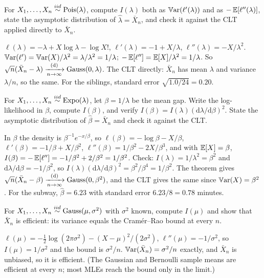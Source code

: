 \begin{exercise}
\label{ex:mle-poisson-info}
For $X_1, \ldots, X_n \stackrel{iid}{\sim} \text{Pois}(\lambda)$, compute $I(\lambda)$ both as $\operatorname*{\mathbb{V}\text{ar}}(\ell'(\lambda))$ and as $-\operatorname*{\mathbb{E}}[\ell''(\lambda)]$, state the asymptotic distribution of $\hat{\lambda} = \bar{X}_n$, and check it against the CLT applied directly to $\bar{X}_n$.
\end{exercise}
\begin{solution}
$\ell(\lambda) = -\lambda + X\log\lambda - \log X!$, $\ell'(\lambda) = -1 + X/\lambda$, $\ell''(\lambda) = -X/\lambda^2$. $\operatorname*{\mathbb{V}\text{ar}}(\ell') = \operatorname*{\mathbb{V}\text{ar}}(X)/\lambda^2 = \lambda/\lambda^2 = 1/\lambda$; $-\operatorname*{\mathbb{E}}[\ell''] = \operatorname*{\mathbb{E}}[X]/\lambda^2 = 1/\lambda$. So $\sqrt{n}(\bar{X}_n - \lambda) \xrightarrow [n \to \infty ]{\text{(d)}} \text{Gauss}(0, \lambda)$. The CLT directly: $\bar{X}_n$ has mean $\lambda$ and variance $\lambda/n$, so the same. For the siblings, standard error $\sqrt{1.0/24} = 0.20$.
\end{solution}

\begin{exercise}
\label{ex:mle-reparam}
For $X_1, \ldots, X_n \stackrel{iid}{\sim} \text{Expo}(\lambda)$, let $\beta = 1/\lambda$ be the mean gap. Write the log-likelihood in $\beta$, compute $I(\beta)$, and verify $I(\beta) = I(\lambda)(\mathrm{d}\lambda/\mathrm{d}\beta)^2$. State the asymptotic distribution of $\hat{\beta} = \bar{X}_n$ and check it against the CLT.
\end{exercise}
\begin{solution}
In $\beta$ the density is $\beta^{-1}e^{-x/\beta}$, so $\ell(\beta) = -\log\beta - X/\beta$, $\ell'(\beta) = -1/\beta + X/\beta^2$, $\ell''(\beta) = 1/\beta^2 - 2X/\beta^3$, and with $\operatorname*{\mathbb{E}}[X] = \beta$, $I(\beta) = -\operatorname*{\mathbb{E}}[\ell''] = -1/\beta^2 + 2/\beta^2 = 1/\beta^2$. Check: $I(\lambda) = 1/\lambda^2 = \beta^2$ and $\mathrm{d}\lambda/\mathrm{d}\beta = -1/\beta^2$, so $I(\lambda)(\mathrm{d}\lambda/\mathrm{d}\beta)^2 = \beta^2/\beta^4 = 1/\beta^2$. The theorem gives $\sqrt{n}(\bar{X}_n - \beta) \xrightarrow [n \to \infty ]{\text{(d)}} \text{Gauss}(0, \beta^2)$, and the CLT gives the same since $\operatorname*{\mathbb{V}\text{ar}}(X) = \beta^2$. For the subway, $\hat{\beta} = 6.23$ with standard error $6.23/8 = 0.78$ minutes.
\end{solution}

\begin{exercise}
\label{ex:mle-gauss-known-var}
For $X_1, \ldots, X_n \stackrel{iid}{\sim} \text{Gauss}(\mu, \sigma^2)$ with $\sigma^2$ known, compute $I(\mu)$ and show that $\bar{X}_n$ is efficient: its variance equals the Cram\'er--Rao bound at every $n$.
\end{exercise}
\begin{solution}
$\ell(\mu) = -\frac12\log(2\pi\sigma^2) - (X - \mu)^2/(2\sigma^2)$, $\ell''(\mu) = -1/\sigma^2$, so $I(\mu) = 1/\sigma^2$ and the bound is $\sigma^2/n$. $\operatorname*{\mathbb{V}\text{ar}}(\bar{X}_n) = \sigma^2/n$ exactly, and $\bar{X}_n$ is unbiased, so it is efficient. (The Gaussian and Bernoulli sample means are efficient at every $n$; most MLEs reach the bound only in the limit.)
\end{solution}


